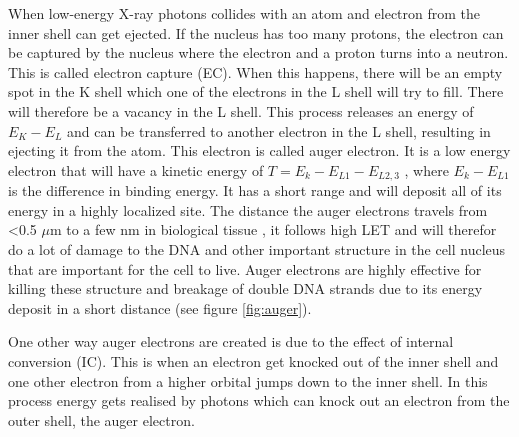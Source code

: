 \documentclass[twoside,english]{uiofysmaster/uiofysmaster}
\begin{document}
When low-energy X-ray photons collides with an atom and electron from the inner shell can get ejected. If the nucleus has too many protons, the electron can be captured by the nucleus where the electron and a proton turns into a neutron. This is called electron capture (EC). When this happens, there will be an empty spot in the K shell which one of the electrons in the L shell will try to fill. There will therefore be a vacancy in the L shell. This process releases an energy of $E_K - E_{L}$ and can be transferred to another electron in the L shell, resulting in ejecting it from the atom. This electron is called auger electron. It is a low energy electron that will have a kinetic energy of $T = E_k - E_{L1} - E_{L2,3}$ \cite{medical}, where $E_k - E_{L1}$ is the difference in binding energy. It has a short range and will deposit all of its energy in a highly localized site. The distance the auger electrons travels from <0.5 $\mu$m to a few nm in biological tissue \cite{augerelectrons}, it follows high LET and will therefor do a lot of damage to the DNA and other important structure in the cell nucleus that are important for the cell to live. Auger electrons are highly effective for killing these structure and breakage of double DNA strands due to its energy deposit in a short distance (see figure \ref{fig:auger}).
\noindent

One other way auger electrons are created is due to the effect of internal conversion (IC). This is when an electron get knocked out of the inner shell and one other electron from a higher orbital jumps down to the inner shell. In this process energy gets realised by photons which can knock out an electron from the outer shell, the auger electron. 
\end{document}
